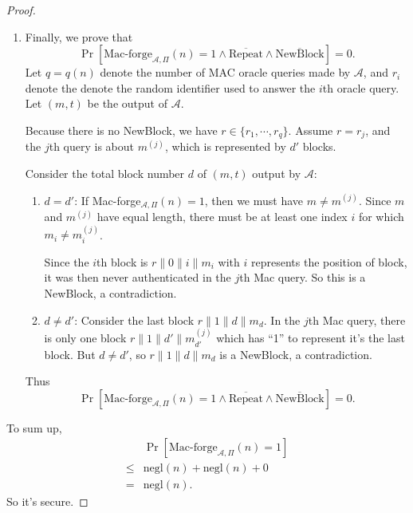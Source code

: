 \documentclass[12pt]{article}
\newcommand{\negl}{\text{negl}}
\newcommand{\Repeat}{\text{Repeat}}
\newcommand{\Newblock}{\text{NewBlock}}
\newcommand{\A}{\mathcal{A}}
\newenvironment{problem}[2][Problem]{\begin{trivlist}
\item[\hskip \labelsep {\bfseries #1}\hskip \labelsep {\bfseries #2.}]}{\end{trivlist}}
\begin{document}
\begin{problem}{4.12}
\begin{proof}
\begin{enumerate}
    \item Finally, we prove that $$\Pr[\text{Mac-forge}_{\A,\Pi}(n)=1\land\overline{\Repeat}\land\overline{\Newblock}]=0.$$
    Let $q=q(n)$ denote the number of MAC oracle queries made by $\A$, and $r_i$ denote the denote the random identifier used to answer the $i$th oracle query. Let $(m,t)$ be the output of $\A$. \par
    Because there is no NewBlock, we have $r\in\{r_1,\cdots,r_q\}$. Assume $r=r_j$, and the $j$th query is about $m^{(j)}$, which is represented by $d'$ blocks. \par 
    Consider the total block number $d$ of $(m,t)$ output by $\A$:
    \begin{enumerate}
        \item $d=d'$: If Mac-forge$_{\A,\Pi}(n)=1$, then we must have $m\ne m^{(j)}$.  Since $m$ and $m^{(j)}$ have equal length, there must be at least one index $i$ for which $m_i\ne m^{(j)}_i$. \par
        Since the $i$th block is $r\|0\|i\|m_i$ with $i$ represents the position of block, it was then never authenticated in the $j$th Mac query. So this is a NewBlock, a contradiction.
        \item $d\ne d'$: Consider the last block $r\|1\|d\|m_d$. In the $j$th Mac query, there is only one block $r\|1\|d'\|m^{(j)}_{d'}$ which has ``1'' to represent it's the last block. But $d\ne d'$, so $r\|1\|d\|m_d$ is a NewBlock, a contradiction.\par
    \end{enumerate}\par
    Thus $$\Pr[\text{Mac-forge}_{\A,\Pi}(n)=1\land\overline{\Repeat}\land\overline{\Newblock}]=0.$$
\end{enumerate}
To sum up, 
\begin{align*}
    &\Pr[\text{Mac-forge}_{\A,\Pi}(n)=1]\\
    \le&\negl(n)+\negl(n)+0\\
    =&\negl(n).
\end{align*}
So it's secure.
\end{proof}
\par
\end{problem}
\end{document}
